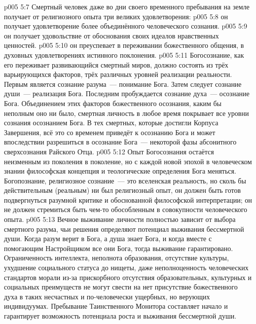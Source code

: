 \vs p005 5:7 \pc Смертный человек даже во дни своего временного пребывания на земле получает от религиозного опыта три великих удовлетворения:
\vs p005 5:8  он получает удовлетворение более объединённого человеческого сознания.
\vs p005 5:9  он получает удовольствие от обоснования своих идеалов нравственных ценностей.
\vs p005 5:10  он преуспевает в переживании божественного общения, в духовных удовлетворениях истинного поклонения.
\vs p005 5:11 \pc Богосознание, как его переживает развивающийся смертный миров, должно состоять из трёх варьирующихся факторов, трёх различных уровней реализации реальности. Первым является сознание разума~--- понимание  Бога. Затем следует сознание души~--- реализация  Бога. Последним пробуждается сознание духа~--- осознание  Бога. Объединением этих факторов божественного осознания, каким бы неполным оно ни было, смертная личность в любое время покрывает все уровни сознания осознанием  Бога. В тех смертных, которые достигли Корпуса Завершения, всё это со временем приведёт к осознанию  Бога и может впоследствии разрешиться в осознание  Бога~--- некоторой фазы абсонитного сверхсознания Райского Отца.
\vs p005 5:12 Опыт Богосознания остаётся неизменным из поколения в поколение, но с каждой новой эпохой в человеческом знании философская концепция и теологические определения Бога  меняться. Богопознание, религиозное сознание~--- это вселенская реальность, но сколь бы действительным (реальным) ни был религиозный опыт, он должен быть готов подвергнуться разумной критике и обоснованной философской интерпретации; он не должен стремиться быть чем\hyp{}то обособленным в совокупности человеческого опыта.
\vs p005 5:13 \pc Вечное выживание личности полностью зависит от выбора смертного разума, чьи решения определяют потенциал выживания бессмертной души. Когда разум верит в Бога, а душа знает Бога, и когда вместе с помогающим Настройщиком все они  Бога, тогда выживание гарантировано. Ограниченность интеллекта, неполнота образования, отсутствие культуры, ухудшение социального статуса до нищеты, даже неполноценность человеческих стандартов морали из\hyp{}за прискорбного отсутствия образовательных, культурных и социальных преимуществ не могут свести на нет присутствие божественного духа в таких несчастных и по\hyp{}человечески ущербных, но верующих индивидуумах. Пребывание Таинственного Монитора составляет начало и гарантирует возможность потенциала роста и выживания бессмертной души.
